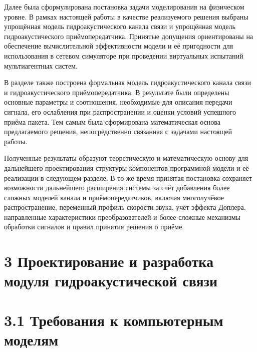 Далее была сформулирована постановка задачи моделирования на физическом
уровне. В рамках настоящей работы в качестве реализуемого решения
выбраны упрощённая модель гидроакустического канала связи и упрощённая
модель гидроакустического приёмопередатчика. Принятые допущения
ориентированы на обеспечение вычислительной эффективности модели и её
пригодности для использования в сетевом симуляторе при проведении
виртуальных испытаний мультиагентных систем.

В разделе также построена формальная модель гидроакустического канала
связи и гидроакустического приёмопередатчика. В результате были
определены основные параметры и соотношения, необходимые для описания
передачи сигнала, его ослабления при распространении и оценки условий
успешного приёма пакета. Тем самым была сформирована математическая
основа предлагаемого решения, непосредственно связанная с задачами
настоящей работы.

Полученные результаты образуют теоретическую и математическую основу для
дальнейшего проектирования структуры компонентов программной модели и её
реализации в следующем разделе. В то же время принятая постановка
сохраняет возможности дальнейшего расширения системы за счёт добавления
более сложных моделей канала и приёмопередатчиков, включая многолучёвое
распространение, переменный профиль скорости звука, учёт эффекта
Доплера, направленные характеристики преобразователей и более сложные
механизмы обработки сигналов и правил принятия решения о приёме.

\section*{3 Проектирование и разработка модуля гидроакустической
связи}\label{ux43fux440ux43eux435ux43aux442ux438ux440ux43eux432ux430ux43dux438ux435-ux438-ux440ux430ux437ux440ux430ux431ux43eux442ux43aux430-ux43cux43eux434ux443ux43bux44f-ux433ux438ux434ux440ux43eux430ux43aux443ux441ux442ux438ux447ux435ux441ux43aux43eux439-ux441ux432ux44fux437ux438}

\section*{3.1 Требования к компьютерным
моделям}\label{ux442ux440ux435ux431ux43eux432ux430ux43dux438ux44f-ux43a-ux43aux43eux43cux43fux44cux44eux442ux435ux440ux43dux44bux43c-ux43cux43eux434ux435ux43bux44fux43c}

